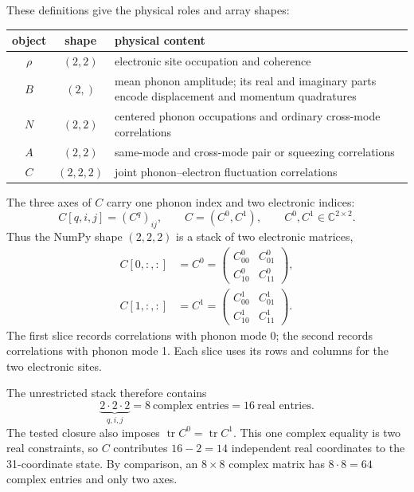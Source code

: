 \documentclass[10pt,letterpaper,twocolumn]{article}
\newcommand{\C}{\mathbb C}
\begin{document}
These definitions give the physical roles and array shapes:

\begin{center}
\small
\begin{tabularx}{\columnwidth}{@{}c c Y@{}}
\toprule
object & shape & physical content\\
\midrule
\(\rho\) & \((2,2)\) & electronic site occupation and coherence\\
\(B\) & \((2,)\) & mean phonon amplitude; its real and imaginary parts encode displacement and momentum quadratures\\
\(N\) & \((2,2)\) & centered phonon occupations and ordinary cross-mode correlations\\
\(A\) & \((2,2)\) & same-mode and cross-mode pair or squeezing correlations\\
\(C\) & \((2,2,2)\) & joint phonon--electron fluctuation correlations\\
\bottomrule
\end{tabularx}
\end{center}

The three axes of \(C\) carry one phonon index and two electronic indices:
\[
C[q,i,j]=(C^q)_{ij},
\qquad
C=(C^0,C^1),
\qquad
C^0,C^1\in\C^{2\times2}.
\]
Thus the NumPy shape \((2,2,2)\) is a stack of two electronic matrices,
\[
\begin{aligned}
C[0,:,:]&=C^0=
\begin{pmatrix}C^0_{00}&C^0_{01}\\C^0_{10}&C^0_{11}\end{pmatrix},\\[3pt]
C[1,:,:]&=C^1=
\begin{pmatrix}C^1_{00}&C^1_{01}\\C^1_{10}&C^1_{11}\end{pmatrix}.
\end{aligned}
\]
The first slice records correlations with phonon mode 0; the second records
correlations with phonon mode 1.  Each slice uses its rows and columns for the
two electronic sites.

The unrestricted stack therefore contains
\[
\underbrace{2\cdot2\cdot2}_{q,i,j}=8\ \text{complex entries}
=16\ \text{real entries}.
\]
The tested closure also imposes
\(\operatorname{tr}C^0=\operatorname{tr}C^1\).  This one complex equality is
two real constraints, so \(C\) contributes \(16-2=14\) independent real
coordinates to the 31-coordinate state.  By comparison, an \(8\times8\)
complex matrix has \(8\cdot8=64\) complex entries and only two axes.
\end{document}
